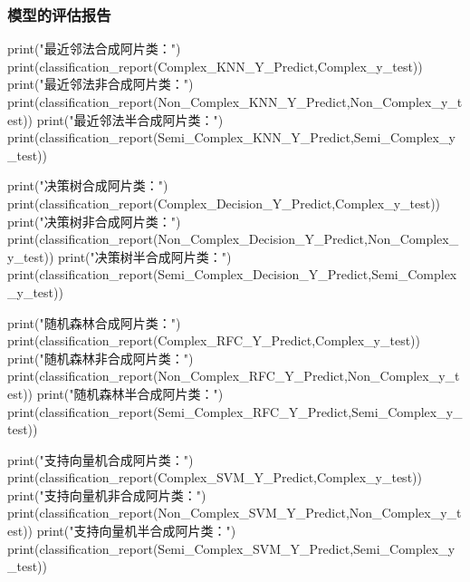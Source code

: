 \documentclass[
]{article}
\newenvironment{Shaded}{}{}
\newcommand{\BuiltInTok}[1]{#1}
\newcommand{\NormalTok}[1]{#1}
\newcommand{\StringTok}[1]{\textcolor[rgb]{0.25,0.44,0.63}{#1}}
\begin{document}
\hypertarget{header-n362}{%
\subsubsection{模型的评估报告}\label{header-n362}}

\begin{Shaded}
\begin{Highlighting}[]
\BuiltInTok{print}\NormalTok{(}\StringTok{"最近邻法合成阿片类："}\NormalTok{)}
\BuiltInTok{print}\NormalTok{(classification\_report(Complex\_KNN\_Y\_Predict,Complex\_y\_test))}
\BuiltInTok{print}\NormalTok{(}\StringTok{"最近邻法非合成阿片类："}\NormalTok{)}
\BuiltInTok{print}\NormalTok{(classification\_report(Non\_Complex\_KNN\_Y\_Predict,Non\_Complex\_y\_test))}
\BuiltInTok{print}\NormalTok{(}\StringTok{"最近邻法半合成阿片类："}\NormalTok{)}
\BuiltInTok{print}\NormalTok{(classification\_report(Semi\_Complex\_KNN\_Y\_Predict,Semi\_Complex\_y\_test))}

\BuiltInTok{print}\NormalTok{(}\StringTok{"决策树合成阿片类："}\NormalTok{)}
\BuiltInTok{print}\NormalTok{(classification\_report(Complex\_Decision\_Y\_Predict,Complex\_y\_test))}
\BuiltInTok{print}\NormalTok{(}\StringTok{"决策树非合成阿片类："}\NormalTok{)}
\BuiltInTok{print}\NormalTok{(classification\_report(Non\_Complex\_Decision\_Y\_Predict,Non\_Complex\_y\_test))}
\BuiltInTok{print}\NormalTok{(}\StringTok{"决策树半合成阿片类："}\NormalTok{)}
\BuiltInTok{print}\NormalTok{(classification\_report(Semi\_Complex\_Decision\_Y\_Predict,Semi\_Complex\_y\_test))}

\BuiltInTok{print}\NormalTok{(}\StringTok{"随机森林合成阿片类："}\NormalTok{)}
\BuiltInTok{print}\NormalTok{(classification\_report(Complex\_RFC\_Y\_Predict,Complex\_y\_test))}
\BuiltInTok{print}\NormalTok{(}\StringTok{"随机森林非合成阿片类："}\NormalTok{)}
\BuiltInTok{print}\NormalTok{(classification\_report(Non\_Complex\_RFC\_Y\_Predict,Non\_Complex\_y\_test))}
\BuiltInTok{print}\NormalTok{(}\StringTok{"随机森林半合成阿片类："}\NormalTok{)}
\BuiltInTok{print}\NormalTok{(classification\_report(Semi\_Complex\_RFC\_Y\_Predict,Semi\_Complex\_y\_test))}

\BuiltInTok{print}\NormalTok{(}\StringTok{"支持向量机合成阿片类："}\NormalTok{)}
\BuiltInTok{print}\NormalTok{(classification\_report(Complex\_SVM\_Y\_Predict,Complex\_y\_test))}
\BuiltInTok{print}\NormalTok{(}\StringTok{"支持向量机非合成阿片类："}\NormalTok{)}
\BuiltInTok{print}\NormalTok{(classification\_report(Non\_Complex\_SVM\_Y\_Predict,Non\_Complex\_y\_test))}
\BuiltInTok{print}\NormalTok{(}\StringTok{"支持向量机半合成阿片类："}\NormalTok{)}
\BuiltInTok{print}\NormalTok{(classification\_report(Semi\_Complex\_SVM\_Y\_Predict,Semi\_Complex\_y\_test))}


\end{Highlighting}
\end{Shaded}
\end{document}
